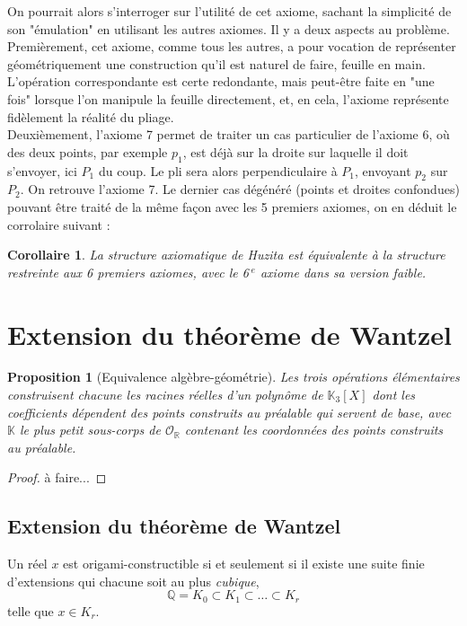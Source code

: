 \documentclass[a4paper,12pt,french]{report}
\newtheorem{proposition}{Proposition}[section]
\newtheorem{corollaire}{Corollaire}[section]
\begin{document}
		On pourrait alors s'interroger sur l'utilité de cet axiome, sachant la simplicité de son "émulation" en utilisant les autres axiomes. Il y a deux aspects au problème. Premièrement, cet axiome, comme tous les autres, a pour vocation de représenter géométriquement une construction qu'il est naturel de faire, feuille en main. L'opération correspondante est certe redondante, mais peut-être faite en "une fois" lorsque l'on manipule la feuille directement, et, en cela, l'axiome représente fidèlement la réalité du pliage.\\
		Deuxièmement, l'axiome 7 permet de traiter un cas particulier de l'axiome 6, où des deux points, par exemple $p_{1}$, est déjà sur la droite sur laquelle il doit s'envoyer, ici $P_{1}$ du coup. Le pli sera alors perpendiculaire à $P_{1}$, envoyant $p_{2}$ sur $P_{2}$. On retrouve l'axiome 7. Le dernier cas dégénéré (points et droites confondues) pouvant être traité de la même façon avec les 5 premiers axiomes, on en déduit le corrolaire suivant :
		
		\begin{corollaire}
			La structure axiomatique de Huzita est équivalente à la structure restreinte aux 6 premiers axiomes, avec le 6$^{\;e}$ axiome dans sa version faible.
		\end{corollaire}
		
	\section{Extension du théorème de Wantzel}
	
	\begin{proposition}[Equivalence algèbre-géométrie]
				Les trois opérations élémentaires construisent chacune les racines réelles d'un polynôme de \(\mathbb{K}_3[X]\) dont les coefficients dépendent des points construits au préalable qui servent de base, avec $\mathbb{K}$ le plus petit sous-corps de $\mathcal{O}_\mathbb{R}$ contenant les coordonnées des points construits au préalable.
	\end{proposition}
	
	\begin{proof}
		à faire...
	\end{proof}
	
	
	\subsection{Extension du théorème de Wantzel}
		\begin{theorem}
			Un réel \( x \) est origami-constructible si et seulement si il existe une suite finie d'extensions qui chacune soit au plus \emph{cubique},
					\[
					\mathbb{Q} = K_0 \subset K_1 \subset \dots \subset K_r
					\]
			telle que \( x \in K_r \).
		\end{theorem}
	
\end{document}
